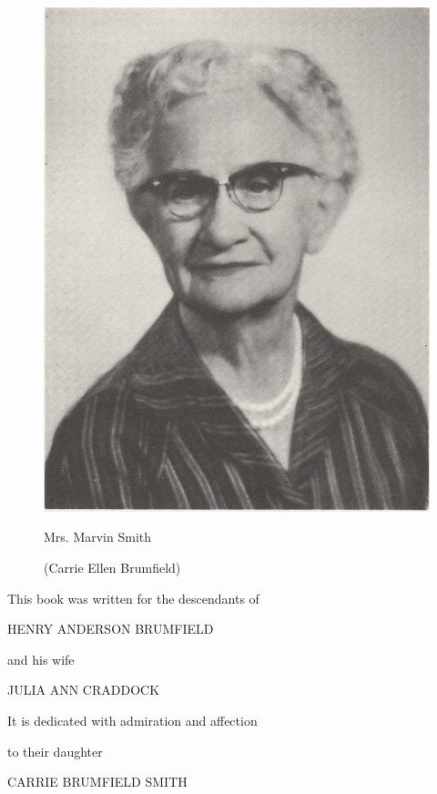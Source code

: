 \begin{figure}[h]
\centering
\includegraphics[width=.6\textwidth]{carrie.jpg}

Mrs. Marvin Smith

(Carrie Ellen Brumfield)
\end{figure}

\begin{center}

This book was written for the descendants of

HENRY ANDERSON BRUMFIELD

and his wife

JULIA ANN CRADDOCK
\end{center}
 
\begin{center}
It is dedicated with admiration and affection

to their daughter

CARRIE BRUMFIELD SMITH
\end{center}

 
